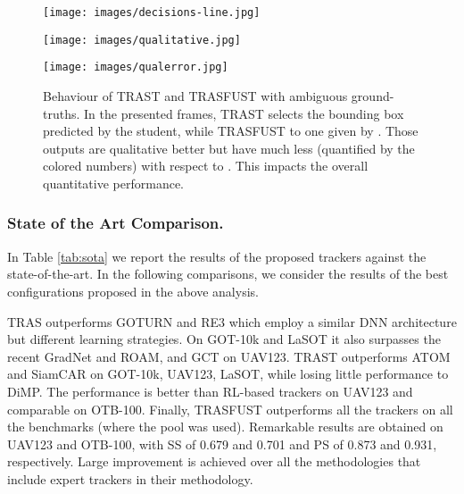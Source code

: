 \documentclass[runningheads]{llncs}
\makeatletter
\def\myalgonamefirst{TRAS\@\xspace}
\def\myalgonamesecond{TRAST\@\xspace}
\def\myalgonamethird{TRASFUST\@\xspace}
\makeatother
\begin{document}
\begin{figure}[t]\begin{minipage}[t]{.49\textwidth}
\centering
\texttt{[image: images/decisions-line.jpg]}
\caption{Per benchmark fractions of predictions attributed to  in the \myalgonamesecond setup.}
\label{fig:decisionsline}
\texttt{[image: images/qualitative.jpg]}
\caption{Qualitative examples of the proposed trackers.}
\label{fig:qualitativeex}
\end{minipage}\hfill
\begin{minipage}[t]{.49\textwidth}
\centering
\texttt{[image: images/qualerror.jpg]}
\caption{Behaviour of \myalgonamesecond and \myalgonamethird with ambiguous ground-truths. In the presented frames, \myalgonamesecond selects the bounding box predicted by the student, while \myalgonamethird to one given by . Those outputs are qualitative better but have much less  (quantified by the colored numbers) with respect to . This impacts the overall quantitative performance. }
\label{fig:qualerror}
\end{minipage}
\end{figure}


\subsubsection{State of the Art Comparison.}
In Table \ref{tab:sota} we report the results of the proposed trackers against the state-of-the-art. In the following comparisons, we consider the results of the best configurations proposed in the above analysis.

\myalgonamefirst outperforms GOTURN and RE3 which employ a similar DNN architecture but different learning strategies. On GOT-10k and LaSOT it also surpasses the recent GradNet and ROAM, and GCT on UAV123.
\myalgonamesecond outperforms ATOM and SiamCAR on GOT-10k, UAV123, LaSOT, while losing little performance to DiMP. The performance is better than RL-based trackers \cite{Yun2017,Chen2018,Ren2018} on UAV123 and comparable on OTB-100. 
Finally, \myalgonamethird outperforms all the trackers on all the benchmarks (where the pool  was used). Remarkable results are obtained on UAV123 and OTB-100, with SS of 0.679 and 0.701 and PS of 0.873 and 0.931, respectively. Large improvement is achieved over all the methodologies that include expert trackers in their methodology. 
\end{document}
